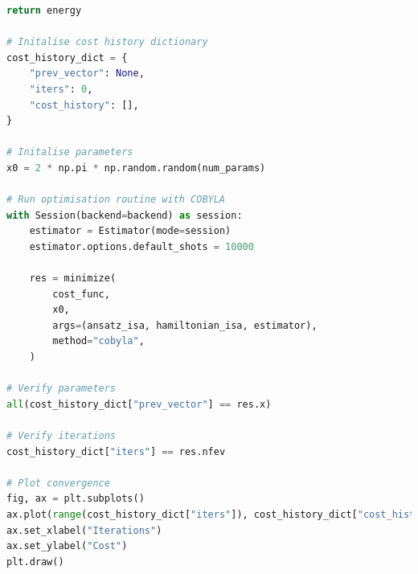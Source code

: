 \documentclass{article}
\begin{document}
\begin{lstlisting}[language=Python]
    return energy

# Initalise cost history dictionary
cost_history_dict = {
    "prev_vector": None,
    "iters": 0,
    "cost_history": [],
}

# Initalise parameters
x0 = 2 * np.pi * np.random.random(num_params)

# Run optimisation routine with COBYLA
with Session(backend=backend) as session:
    estimator = Estimator(mode=session)
    estimator.options.default_shots = 10000

    res = minimize(
        cost_func,
        x0,
        args=(ansatz_isa, hamiltonian_isa, estimator),
        method="cobyla",
    )

# Verify parameters
all(cost_history_dict["prev_vector"] == res.x)

# Verify iterations
cost_history_dict["iters"] == res.nfev

# Plot convergence
fig, ax = plt.subplots()
ax.plot(range(cost_history_dict["iters"]), cost_history_dict["cost_history"])
ax.set_xlabel("Iterations")
ax.set_ylabel("Cost")
plt.draw()

\end{lstlisting}
\end{document}
